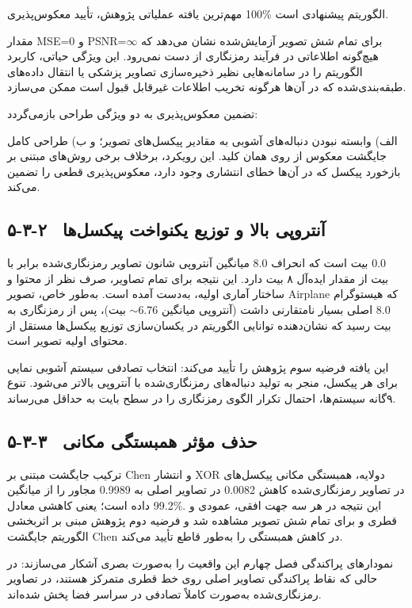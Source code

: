 مهم‌ترین یافته عملیاتی پژوهش، تأیید معکوس‌پذیری ‎100\%‎ الگوریتم پیشنهادی است.

مقدار ‎MSE=0‎ و ‎PSNR‎=$\infty$ برای تمام شش تصویر آزمایش‌شده نشان می‌دهد که هیچ‌گونه اطلاعاتی در فرآیند رمزنگاری از دست نمی‌رود. این ویژگی حیاتی، کاربرد الگوریتم را در سامانه‌هایی نظیر ذخیره‌سازی تصاویر پزشکی یا انتقال داده‌های طبقه‌بندی‌شده که در آن‌ها هرگونه تخریب اطلاعات غیرقابل قبول است  ممکن می‌سازد.

تضمین معکوس‌پذیری به دو ویژگی طراحی بازمی‌گردد:

الف) وابسته نبودن دنباله‌های آشوبی به مقادیر پیکسل‌های تصویر؛ و ب) طراحی کامل جایگشت معکوس از روی همان کلید. این رویکرد، برخلاف برخی روش‌های مبتنی بر بازخورد پیکسل که در آن‌ها خطای انتشاری وجود دارد، معکوس‌پذیری قطعی را تضمین می‌کند.

\subsection{۵-۳-۲  آنتروپی بالا و توزیع یکنواخت پیکسل‌ها}

میانگین آنتروپی شانون تصاویر رمزنگاری‌شده برابر با ‎8.0‎ بیت است که انحراف ‎0.0‎ بیت از مقدار ایده‌آل ۸ بیت دارد. این نتیجه برای تمام تصاویر، صرف نظر از محتوا و ساختار آماری اولیه، به‌دست آمده است. به‌طور خاص، تصویر ‎Airplane‎ که هیستوگرام اصلی بسیار نامتقارنی داشت (آنتروپی میانگین $\sim 6.76$ بیت)، پس از رمزنگاری به ‎8.0‎ بیت رسید که نشان‌دهنده توانایی الگوریتم در یکسان‌سازی توزیع پیکسل‌ها مستقل از محتوای اولیه تصویر است.

این یافته فرضیه سوم پژوهش را تأیید می‌کند: انتخاب تصادفی سیستم آشوبی نمایی برای هر پیکسل، منجر به تولید دنباله‌های رمزنگاری‌شده با آنتروپی بالاتر می‌شود. تنوع ۹گانه سیستم‌ها، احتمال تکرار الگوی رمزنگاری را در سطح بایت به حداقل می‌رساند.

\subsection{۵-۳-۳  حذف مؤثر همبستگی مکانی}

ترکیب جایگشت مبتنی بر ‎Chen‎ و انتشار ‎XOR‎ دولایه، همبستگی مکانی پیکسل‌های مجاور را از میانگین ‎0.9989‎ در تصاویر اصلی به ‎0.0082‎ در تصاویر رمزنگاری‌شده کاهش داده است؛ یعنی کاهشی معادل ‎‎99.2\%‎. این نتیجه در هر سه جهت افقی، عمودی و قطری و برای تمام شش تصویر مشاهده شد و فرضیه دوم پژوهش  مبنی بر اثربخشی الگوریتم جایگشت ‎Chen‎ در کاهش همبستگی  را به‌طور قاطع تأیید می‌کند.

نمودارهای پراکندگی فصل چهارم این واقعیت را به‌صورت بصری آشکار می‌سازند: در حالی که نقاط پراکندگی تصاویر اصلی روی خط قطری متمرکز هستند، در تصاویر رمزنگاری‌شده به‌صورت کاملاً تصادفی در سراسر فضا پخش شده‌اند.

